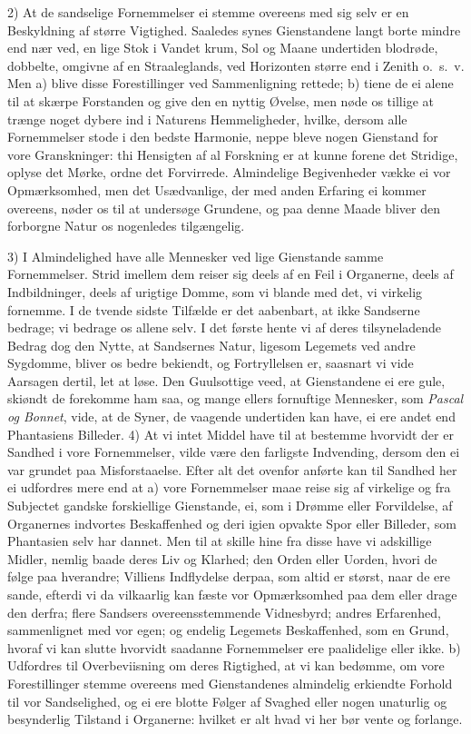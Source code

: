 \documentclass[12pt,a4paper]{article}
\newcommand{\opage}[1]{\marginnote{\footnotesize\textit{[#1]}}}
\begin{document}
2) At de sandselige Fornemmelser ei stemme overeens med sig selv er en Beskyldning af
større Vigtighed. Saaledes synes Gienstandene langt borte mindre end nær ved, en lige
Stok i Vandet krum, Sol og Maane undertiden blodrøde, dobbelte, omgivne af en
Straaleglands, ved Horizonten større end i Zenith o.~s.~v. Men a) blive disse
Forestillinger ved Sammenligning rettede; b) tiene de ei alene til at skærpe Forstanden
og give den en nyttig Øvelse, men nøde os tillige at trænge noget dybere ind i Naturens
Hemmeligheder, hvilke, dersom alle Fornemmelser stode i den bedste Harmonie, neppe bleve
nogen Gienstand for vore Granskninger: thi Hensigten af al Forskning er at kunne forene
det Stridige, oplyse det Mørke, ordne det Forvirrede. Almindelige Begivenheder vække ei
vor Opmærksomhed, men det Usædvanlige, der med anden Erfaring ei kommer overeens, nøder
os til at undersøge Grundene, og paa denne Maade bliver den forborgne Natur os
nogenledes tilgængelig.

3) I Almindelighed have alle Mennesker ved lige Gienstande samme Fornemmelser. Strid
imellem dem reiser sig deels af en Feil i Organerne, deels af Indbildninger, deels af
urigtige Domme, som vi blande med det, vi virkelig fornemme. I de tvende sidste Tilfælde
er det aabenbart, at ikke Sandserne bedrage; vi bedrage
\opage{89} os allene selv. I det første hente vi af deres tilsyneladende Bedrag dog den Nytte, at
Sandsernes Natur, ligesom Legemets ved andre Sygdomme, bliver os bedre bekiendt, og
Fortryllelsen er, saasnart vi vide Aarsagen dertil, let at løse. Den Guulsottige veed,
at Gienstandene ei ere gule, skiøndt de forekomme ham saa, og mange ellers fornuftige
Mennesker, som \emph{Pascal og Bonnet}, vide, at de Syner, de vaagende undertiden kan
have, ei ere andet end Phantasiens Billeder. 4) At vi intet Middel have til at bestemme
hvorvidt der er Sandhed i vore Fornemmelser, vilde være den farligste Indvending, dersom
den ei var grundet paa Misforstaaelse. Efter alt det ovenfor anførte kan til Sandhed her
ei udfordres mere end at a) vore Fornemmelser maae reise sig af virkelige og fra
Subjectet gandske forskiellige Gienstande, ei, som i Drømme eller Forvildelse, af
Organernes indvortes Beskaffenhed og deri igien opvakte Spor eller Billeder, som
Phantasien selv har dannet. Men til at skille hine fra disse have vi adskillige Midler,
nemlig baade deres Liv og Klarhed; den Orden eller Uorden, hvori de følge paa hverandre;
Villiens Indflydelse derpaa, som altid er størst, naar de ere sande, efterdi vi da
vilkaarlig kan fæste vor Opmærksomhed paa dem eller drage den derfra; flere Sandsers
overeensstemmende Vidnesbyrd; andres Erfarenhed, sammenlignet med vor egen; og endelig
Legemets Beskaffenhed, som en Grund, hvoraf vi kan slutte hvorvidt saadanne
\opage{90} Fornemmelser ere paalidelige eller ikke. b) Udfordres til Overbeviisning om deres
Rigtighed, at vi kan bedømme, om vore Forestillinger stemme overeens med Gienstandenes
almindelig erkiendte Forhold til vor Sandselighed, og ei ere blotte Følger af Svaghed
eller nogen unaturlig og besynderlig Tilstand i Organerne: hvilket er alt hvad vi her
bør vente og forlange.
\end{document}
